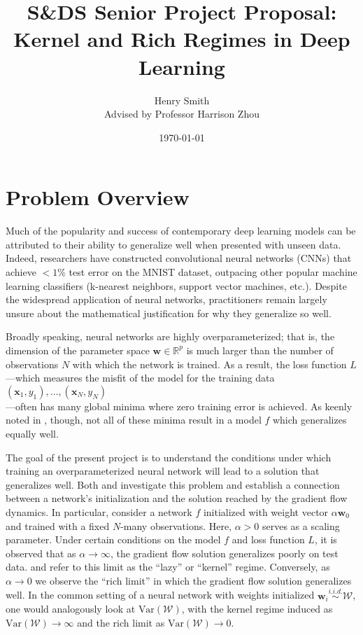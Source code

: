 \documentclass{article}
\title{\textbf{S\&DS Senior Project Proposal: \\Kernel and Rich Regimes in Deep Learning}}
\author[]{Henry Smith \\
Advised by Professor Harrison Zhou}
\affil[]{\normalsize Yale University}
\date{\today}
\begin{document}
\maketitle

\section{Problem Overview}
Much of the popularity and success of contemporary deep learning models can be attributed to their ability to generalize well when presented with unseen data. Indeed, researchers have constructed convolutional neural networks (CNNs) that achieve $< 1$\% test error on the MNIST dataset, outpacing other popular machine learning classifiers (k-nearest neighbors, support vector machines, etc.). Despite the widespread application of neural networks, practitioners remain largely unsure about the mathematical justification for why they generalize so well. 

Broadly speaking, neural networks are highly overparameterized; that is, the dimension of the parameter space $\boldsymbol{w} \in \mathbb{R}^p$ is much larger than the number of observations $N$ with which the network is trained. As a result, the loss function $L$—which measures the misfit of the model for the training data $(\boldsymbol{x}_1, y_1), \ldots, (\boldsymbol{x}_N, y_N)$\\—often has many global minima where zero training error is achieved. As keenly noted in \cite{woodworth2020kernel}, though, not all of these minima result in a model $f$ which generalizes equally well.

The goal of the present project is to understand the conditions under which training an overparameterized neural network will lead to a solution that generalizes well. Both \cite{chizat2018lazy} and \cite{woodworth2020kernel} investigate this problem and establish a connection between a network's initialization and the solution reached by the gradient flow dynamics. In particular, consider a network $f$ initialized with weight vector $\alpha \boldsymbol{w}_0$ and trained with a fixed $N$-many observations. Here, $\alpha > 0$ serves as a scaling parameter. Under certain conditions on the model $f$ and loss function $L$, it is observed that as $\alpha \rightarrow \infty$, the gradient flow solution generalizes poorly on test data. \cite{chizat2018lazy} and \cite{woodworth2020kernel} refer to this limit as the \enquote{lazy} or \enquote{kernel} regime. Conversely, as $\alpha \rightarrow 0$ we observe the \enquote{rich limit} in which the gradient flow solution generalizes well. In the common setting of a neural network with weights initialized $\boldsymbol{w}_i \overset{i.i.d.}{\sim} \mathcal{W}$, one would analogously look at $\text{Var}(\mathcal{W})$, with the kernel regime induced as $\text{Var}(\mathcal{W}) \rightarrow \infty$ and the rich limit as $\text{Var}(\mathcal{W}) \rightarrow 0$.
\end{document}
